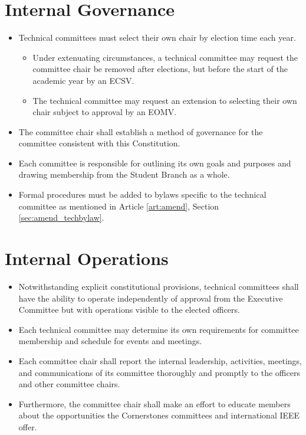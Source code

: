 \documentclass[12pt]{constitution}
\begin{document}
\section{Internal Governance}
\label{sec:tech_govern}
\begin{itemize}
    \item Technical committees must select their own chair by election time each year.
	\begin{itemize}
	\item Under extenuating circumstances, a technical committee may request the committee chair be removed after elections, but before the start of the academic year by an ECSV. 
	\item The technical committee may request an extension to selecting their own chair subject to approval by an EOMV.
	\end{itemize}
    \item The committee chair shall establish a method of governance for the committee consistent with this Constitution.
    \item Each committee is responsible for outlining its own goals and purposes and drawing membership from the Student Branch as a whole.
    \item Formal procedures must be added to bylaws specific to the technical committee as mentioned in Article \ref{art:amend}, Section \ref{sec:amend_techbylaw}.
\end{itemize}

\section{Internal Operations}
\label{sec:tech_operate}
\begin{itemize}
    \item Notwithstanding explicit constitutional provisions, technical committees shall have the ability to operate independently of approval from the Executive Committee but with operations visible to the elected officers.
    \item Each technical committee may determine its own requirements for committee membership and schedule for events and meetings.
    \item Each committee chair shall report the internal leadership, activities, meetings, and communications of its committee thoroughly and promptly to the officers and other committee chairs.
    \item Furthermore, the committee chair shall make an effort to educate members about the opportunities the Cornerstones committees and international IEEE offer.
\end{itemize}
\end{document}
